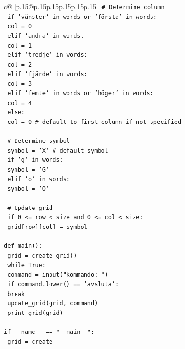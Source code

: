 \documentclass{article}
\begin{document}
{\begin{supertabular}{c@{$\;$}|p{.15\linewidth}@{}p{.15\linewidth}p{.15\linewidth}p{.15\linewidth}p{.15\linewidth}p{.15\linewidth}}
{{{\texttt{    \# Determine column} \\
\texttt{    if 'vänster' in words or 'första' in words:} \\
\texttt{        col = 0} \\
\texttt{    elif 'andra' in words:} \\
\texttt{        col = 1} \\
\texttt{    elif 'tredje' in words:} \\
\texttt{        col = 2} \\
\texttt{    elif 'fjärde' in words:} \\
\texttt{        col = 3} \\
\texttt{    elif 'femte' in words or 'höger' in words:} \\
\texttt{        col = 4} \\
\texttt{    else:} \\
\texttt{        col = 0  \# default to first column if not specified} \\
\\ 
\texttt{    \# Determine symbol} \\
\texttt{    symbol = 'X'  \# default symbol} \\
\texttt{    if 'g' in words:} \\
\texttt{        symbol = 'G'} \\
\texttt{    elif 'o' in words:} \\
\texttt{        symbol = 'O'} \\
\\ 
\texttt{    \# Update grid} \\
\texttt{    if 0 <= row < size and 0 <= col < size:} \\
\texttt{        grid{[}row{]}{[}col{]} = symbol} \\
\\ 
\texttt{def main():} \\
\texttt{    grid = create\_grid()} \\
\texttt{    while True:} \\
\texttt{        command = input("kommando: ")} \\
\texttt{        if command.lower() == 'avsluta':} \\
\texttt{            break} \\
\texttt{        update\_grid(grid, command)} \\
\texttt{        print\_grid(grid)} \\
\\ 
\texttt{if \_\_name\_\_ == "\_\_main\_\_":} \\
\texttt{    grid = create} \\
            }
        }
    }
     \\ \\


\end{supertabular}}
\end{document}

